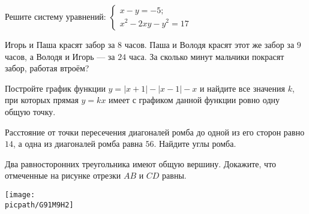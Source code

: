 \begin{homework}[number=2]
	\begin{listofex}
		\item Решите систему уравнений: \( \begin{cases} x-y=-5; \\ x^2-2xy-y^2=17 \end{cases} \)
		\item Игорь и Паша красят забор за \( 8 \) часов. Паша и Володя красят этот же забор за \( 9 \) часов, а Володя и Игорь --- за \( 24 \) часа. За сколько минут мальчики покрасят забор, работая втроём?
		\item Постройте график функции \( y=|x+1|-|x-1|-x \) и найдите все значения \( k \), при которых прямая \( y=kx \) имеет с графиком данной функции ровно одну общую точку.
		\item Расстояние от точки пересечения диагоналей ромба до одной из его сторон равно \( 14 \), а одна из диагоналей ромба равна \( 56 \). Найдите углы ромба.
		\item 
		\begin{minipage}[t]{\bodywidth}
			 Два равносторонних треугольника имеют общую вершину. Докажите, что отмеченные на рисунке отрезки \( AB \) и \( CD \) равны.
		\end{minipage}
		\gapwidth
		\begin{minipage}[t]{\picwidth}
			\texttt{[image: \\picpath/G91M9H2]}
		\end{minipage}
	\end{listofex}
\end{homework}

